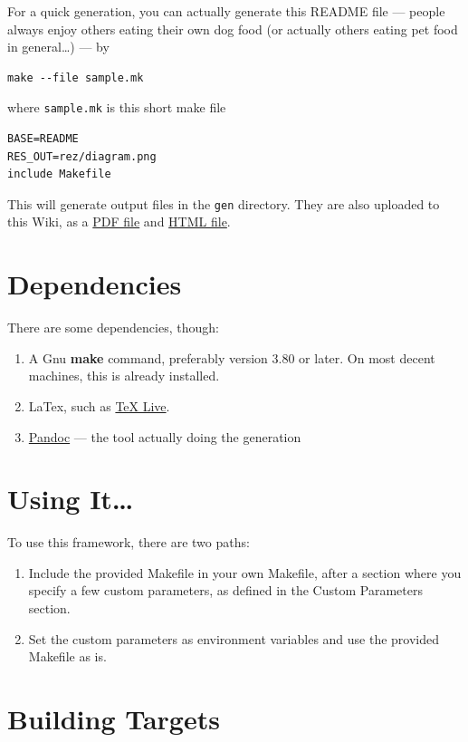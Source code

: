\documentclass[oneside,]{memoir}
\begin{document}
For a quick generation, you can actually generate this README file ---
people always enjoy others eating their own dog food (or actually others
eating pet food in general\ldots{}) --- by

\begin{verbatim}
make --file sample.mk
\end{verbatim}
where \texttt{sample.mk} is this short make file

\begin{verbatim}
BASE=README
RES_OUT=rez/diagram.png
include Makefile
\end{verbatim}
This will generate output files in the \texttt{gen} directory. They are
also uploaded to this Wiki, as a \href{./gen/README.pdf}{PDF file} and
\href{./gen/README.html}{HTML file}.

\section{Dependencies}

There are some dependencies, though:

\begin{enumerate}[1.]
\item
  A Gnu \textbf{make} command, preferably version 3.80 or later. On most
  decent machines, this is already installed.
\item
  LaTex, such as \href{http://www.tug.org/texlive/}{TeX Live}.
\item
  \href{http://johnmacfarlane.net/pandoc/}{Pandoc} --- the tool actually
  doing the generation
\end{enumerate}
\section{Using It\ldots{}}

To use this framework, there are two paths:

\begin{enumerate}[1.]
\item
  Include the provided Makefile in your own Makefile, after a section
  where you specify a few custom parameters, as defined in the Custom
  Parameters section.
\item
  Set the custom parameters as environment variables and use the
  provided Makefile as is.
\end{enumerate}
\section{Building Targets}
\end{document}
